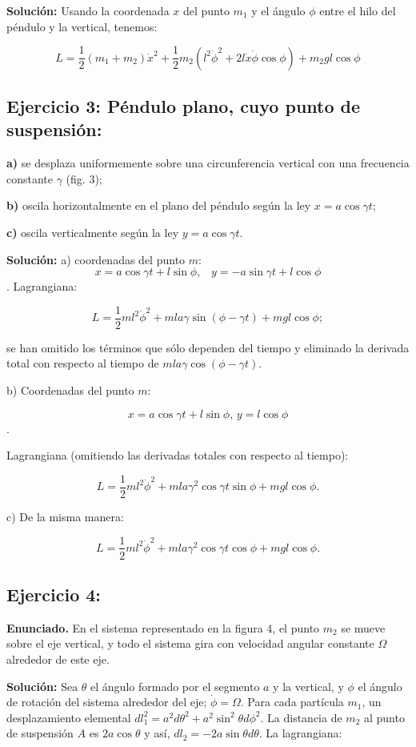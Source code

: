 \documentclass[12pt]{article}
\begin{document}
\textbf{Solución:} Usando la coordenada $x$ del punto $m_1$ y el ángulo $\phi$ entre el hilo del péndulo y la vertical, tenemos:

$$
L = \frac{1}{2} (m_1 + m_2) \dot{x}^2 + \frac{1}{2} m_2 (l^2 \dot{\phi}^2 + 2 l \dot{x} \dot{\phi} \cos \phi) + m_2 g l \cos \phi
$$

\subsection{Ejercicio 3: Péndulo plano, cuyo punto de suspensión:}
\textbf{a)}  se desplaza uniformemente sobre una circunferencia vertical con una frecuencia constante $\gamma$ (fig. 3);  

\textbf{b)} oscila horizontalmente en el plano del péndulo según la ley $x = a \cos \gamma t$;

\textbf{c)} oscila verticalmente según la ley $y = a \cos \gamma t$.

\textbf{Solución:} a) coordenadas del punto $m$: 
$$ x = a \cos \gamma t + l \sin \phi \text{,       } \text{        } y = -a \sin \gamma t + l \cos \phi $$.
Lagrangiana:

$$
L = \frac{1}{2} m l^2 \dot{\phi}^2 + m l a \gamma \sin(\phi - \gamma t) + m g l \cos \phi;
$$

se han omitido los términos que sólo dependen del tiempo y eliminado la derivada total con respecto al tiempo de $ m l a \gamma \cos(\phi - \gamma t) $.

b) Coordenadas del punto $m$:

$$ x = a \cos \gamma t + l \sin \phi \text{,   }\text{} y = l \cos \phi $$.

Lagrangiana (omitiendo las derivadas totales con respecto al tiempo):

$$
L = \frac{1}{2} m l^2 \dot{\phi}^2 + m l a \gamma^2 \cos \gamma t \sin \phi + m g l \cos \phi.
$$

c) De la misma manera:

$$
L = \frac{1}{2} m l^2 \dot{\phi}^2 + m l a \gamma^2 \cos \gamma t \cos \phi + m g l \cos \phi.
$$

\subsection{Ejercicio 4:}
\textbf{Enunciado.} En el sistema representado en la figura 4, el punto $m_2$ se mueve sobre el eje vertical, y todo el sistema gira con velocidad angular constante $\Omega$ alrededor de este eje.

\textbf{Solución:} Sea $\theta$ el ángulo formado por el segmento $a$ y la vertical, y $\phi$ el ángulo de rotación del sistema alrededor del eje; $\dot{\phi} = \Omega$. Para cada partícula $m_1$, un desplazamiento elemental $dl_1^2 = a^2 d\theta^2 + a^2 \sin^2 \theta d\phi^2$. La distancia de $m_2$ al punto de suspensión $A$ es $2a \cos \theta$ y así, $dl_2 = -2a \sin \theta d\theta$. La lagrangiana:
\end{document}
